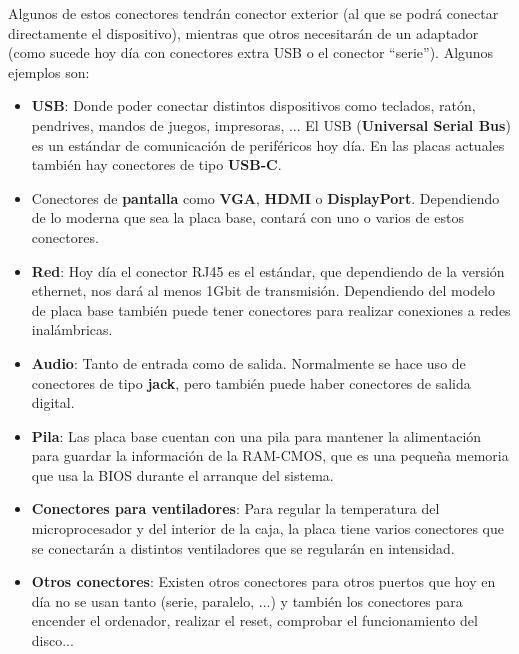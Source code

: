 \begin{itemize}
    Algunos de estos conectores tendrán conector exterior (al que se podrá conectar directamente el dispositivo), mientras que otros necesitarán de un adaptador (como sucede hoy día con conectores extra USB o el conector “serie”). Algunos ejemplos son:
    \begin{itemize}
        \item \textbf{USB}: Donde poder conectar distintos dispositivos como teclados, ratón, pendrives, mandos de juegos, impresoras, ... El USB (\textbf{Universal Serial Bus}) es un estándar de comunicación de periféricos hoy día. En las placas actuales también hay conectores de tipo \textbf{USB-C}.

        \item Conectores de \textbf{pantalla} como \textbf{VGA}, \textbf{HDMI} o \textbf{DisplayPort}. Dependiendo de lo moderna que sea la placa base, contará con uno o varios de estos conectores.

        \item \textbf{Red}: Hoy día el conector RJ45 es el estándar, que dependiendo de la versión ethernet, nos dará al menos 1Gbit de transmisión. Dependiendo del modelo de placa base también puede tener conectores para realizar conexiones a redes inalámbricas.

        \item \textbf{Audio}: Tanto de entrada como de salida. Normalmente se hace uso de conectores de tipo \textbf{jack}, pero también puede haber conectores de salida digital.

        \item \textbf{Pila}: Las placa base cuentan con una pila para mantener la alimentación para guardar la información de la RAM-CMOS, que es una pequeña memoria que usa la BIOS durante el arranque del sistema.

        \item \textbf{Conectores para ventiladores}: Para regular la temperatura del microprocesador y del interior de la caja, la placa tiene varios conectores que se conectarán a distintos ventiladores que se regularán en intensidad.

        \item \textbf{Otros conectores}: Existen otros conectores para otros puertos que hoy en día no se usan tanto (serie, paralelo, ...) y también los conectores para encender el ordenador, realizar el reset, comprobar el funcionamiento del disco...
    \end{itemize}

\end{itemize}

